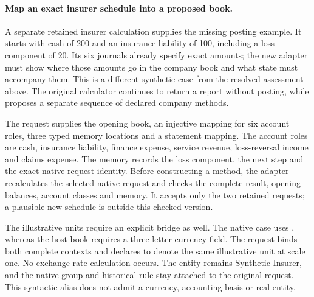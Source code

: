 \paragraph{Map an exact insurer schedule into a proposed book.}
A separate retained insurer calculation supplies the missing posting example.
It starts with cash of 200 and an insurance liability of 100, including a loss
component of 20. Its six journals already specify exact amounts; the new
adapter must show where those amounts go in the company book and what state
must accompany them. This is a different synthetic case from the resolved
assessment above. The original calculator continues to return a report without
posting, while  proposes a separate sequence of
declared company methods.

The request supplies the opening book, an injective mapping for six account
roles, three typed memory locations and a statement mapping. The account roles
are cash, insurance liability, finance expense, service revenue, loss-reversal
income and claims expense. The memory records the loss component, the next
step and the exact native request identity. Before constructing a method, the
adapter recalculates the selected native request and checks the complete result,
opening balances, account classes and memory. It accepts only the two retained
requests; a plausible new schedule is outside this checked version.

The illustrative units require an explicit bridge as well. The native case
uses , whereas the host book requires a three-letter currency field.
The request binds both complete contexts and declares  to denote
the same illustrative unit at scale one. No exchange-rate calculation occurs.
The entity remains Synthetic Insurer, and the native group and historical
rule stay attached to the original request. This syntactic alias does not
admit a currency, accounting basis or real entity.

